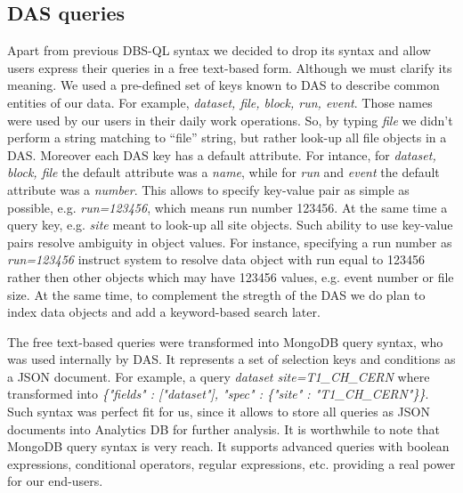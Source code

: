 \documentclass[a4paper]{jpconf}
\begin{document}

\subsection{DAS queries}
Apart from previous DBS-QL syntax we decided to drop its syntax and allow users
express their queries in a free text-based form. Although we must clarify its
meaning. We used a pre-defined set of keys known to DAS to describe common
entities of our data. For example, {\it dataset, file, block, run, event}. Those
names were used by our users in their daily work operations. So, by typing
{\it file} we didn't perform a string matching to ``file'' string, but rather
look-up all file objects in a DAS. Moreover each DAS key has a default attribute.
For intance, for {\it dataset, block, file} the default attribute 
was a {\it name}, while for {\it run} and {\it event} the default attribute was 
a {\it number}. This allows to specify key-value pair as simple as possible, e.g.
{\it run=123456}, which means run number 123456. At the same time a query 
key, e.g. {\it site} meant to look-up all site objects. Such ability
to use key-value pairs resolve ambiguity in object values. For instance,
specifying a run number as {\it run=123456} instruct system to resolve
data object with run equal to 123456 rather then other objects which may have
123456 values, e.g. event number or file size. At the same time, to complement
the stregth of the DAS we do plan to index data objects and add a keyword-based 
search later.

The free text-based queries were transformed into MongoDB query syntax, 
who was used internally by DAS. It represents a set of selection 
keys and conditions as a JSON document. For example, a query
{\it dataset site=T1\_CH\_CERN}
where transformed into 
{\it \{"fields" : ["dataset"], "spec" : \{"site" : "T1\_CH\_CERN"\}\}}.
Such syntax was perfect fit for us, since it allows to store all queries
as JSON documents into Analytics DB for further analysis. It is worthwhile to note that
MongoDB query syntax is very reach. It supports advanced queries with 
boolean expressions, conditional operators, regular expressions, etc. providing
a real power for our end-users.
\end{document}
